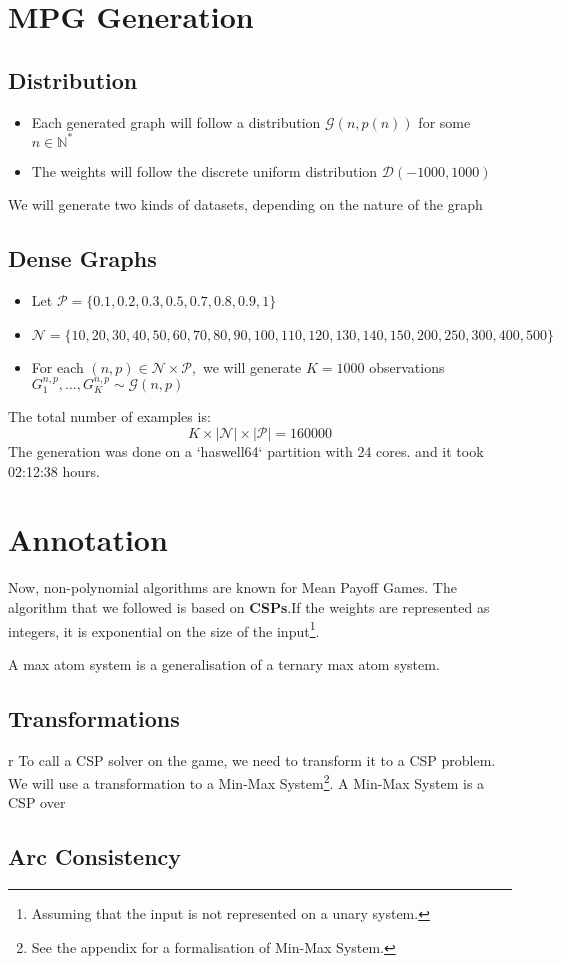 \section{MPG Generation}
\subsection{Distribution}
\begin{itemize}
	\item Each generated graph will follow a distribution $\mathcal{G}(n,p(n))$  for some $n\in\mathbb{N}^*$
	\item The weights will follow the discrete uniform distribution $\mathcal{D}(-1000,1000)$

\end{itemize}

We will generate two kinds of datasets, depending on the nature of the graph

\subsection{Dense Graphs}
\begin{itemize}
	\item Let $\mathcal{P}=\{0.1,0.2,0.3,0.5,0.7,0.8,0.9,1\}$
	\item $\mathcal{N}=\{10,20,30,40,50,60,70,80,90,100,110,120,130,140,150,200,250,300,400,500\}$
	\item For each $(n,p)\in \mathcal{N}\times \mathcal{P},$ we will generate $K=1000$ observations $G^{n,p}_1,\dots,G^{n,p}_{K} \sim \mathcal{G}(n,p)$ 
\end{itemize} 

The total number of examples is:
$$
K\times\lvert \mathcal{N} \rvert \times \lvert \mathcal{P}\rvert=160000
$$
The generation was done on a `haswell64` partition with 24 cores. and it took 02:12:38 hours.

\section{Annotation}
Now, non-polynomial algorithms are known for Mean Payoff Games. 
\newline 
The algorithm that we followed is based on \textbf{CSPs}.If the weights are represented as integers, it is exponential on the size of the input\footnote{Assuming that the input is not represented on a unary system.}.


A max atom system is a generalisation of a ternary max atom system. 

\subsection{Transformations}r
To call a CSP solver on the game, we need to transform it to a CSP problem.
\newline We will use a transformation to a Min-Max System\footnote{See the appendix for a formalisation of Min-Max System.}.\newline
A Min-Max System is a CSP over 


\subsection{Arc Consistency}
